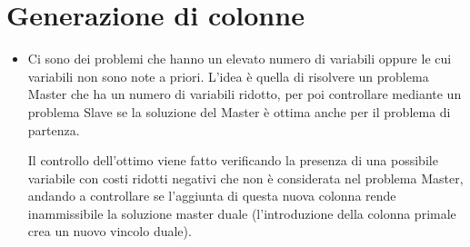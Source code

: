 \section{Generazione di colonne}

\begin{itemize}
	\item Ci sono dei problemi che hanno un elevato numero di variabili oppure le cui variabili non sono note a priori. L'idea è quella di risolvere un problema Master che ha un numero di variabili ridotto, per poi controllare mediante un problema Slave se la soluzione del Master è ottima anche per il problema di partenza.
	
	Il controllo dell'ottimo viene fatto verificando la presenza di una possibile variabile con costi ridotti negativi che non è considerata nel problema Master, andando a controllare se l'aggiunta di questa nuova colonna rende inammissibile la soluzione master duale (l'introduzione della colonna primale crea un nuovo vincolo duale).
	

\end{itemize}
